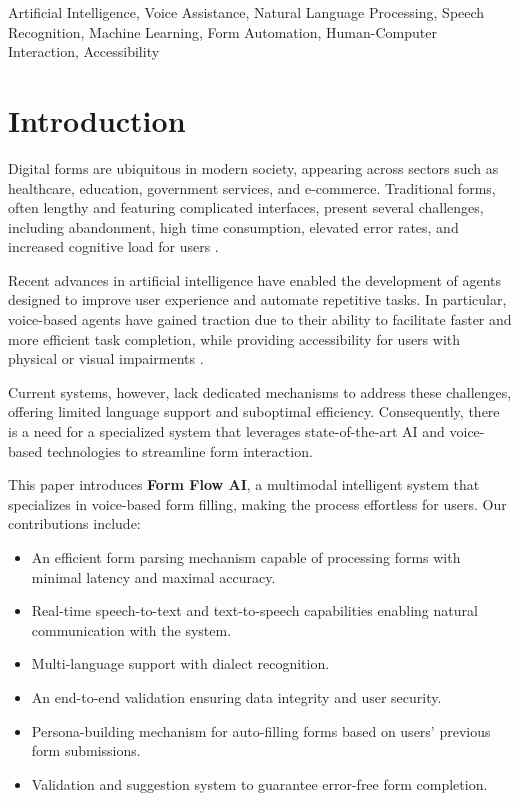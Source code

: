 \documentclass[conference]{IEEEtran}
\begin{document}
\begin{IEEEkeywords}
Artificial Intelligence, Voice Assistance, Natural Language Processing, Speech Recognition, Machine Learning, Form Automation, Human-Computer Interaction, Accessibility
\end{IEEEkeywords}

\section{Introduction}

Digital forms are ubiquitous in modern society, appearing across sectors such as healthcare, education, government services, and e-commerce. Traditional forms, often lengthy and featuring complicated interfaces, present several challenges, including abandonment, high time consumption, elevated error rates, and increased cognitive load for users \cite{b1}.

Recent advances in artificial intelligence have enabled the development of agents designed to improve user experience and automate repetitive tasks. In particular, voice-based agents have gained traction due to their ability to facilitate faster and more efficient task completion, while providing accessibility for users with physical or visual impairments \cite{b2}.

Current systems, however, lack dedicated mechanisms to address these challenges, offering limited language support and suboptimal efficiency. Consequently, there is a need for a specialized system that leverages state-of-the-art AI and voice-based technologies to streamline form interaction.

This paper introduces \textbf{Form Flow AI}, a multimodal intelligent system that specializes in voice-based form filling, making the process effortless for users. Our contributions include:

\begin{itemize}
    \item An efficient form parsing mechanism capable of processing forms with minimal latency and maximal accuracy.
    \item Real-time speech-to-text and text-to-speech capabilities enabling natural communication with the system.
    \item Multi-language support with dialect recognition.
    \item An end-to-end validation ensuring data integrity and user security.
    \item Persona-building mechanism for auto-filling forms based on users' previous form submissions.
    \item Validation and suggestion system to guarantee error-free form completion.
\end{itemize}
\end{document}
